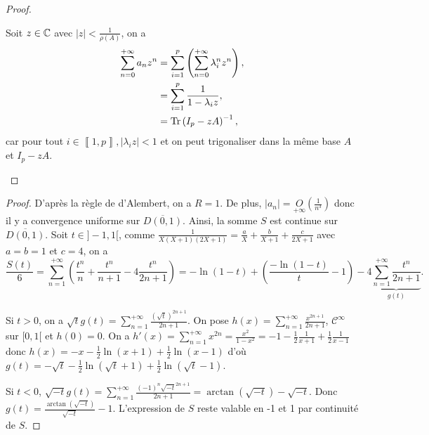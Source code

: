 \documentclass[12pt]{article}
\begin{document}
\begin{proof}
\begin{enumerate}
        Soit $z\in\mathbb{C}$ avec $\left\lvert z\right\rvert<\frac{1}{\rho(A)}$, on a 
        \begin{align}
            \sum_{n=0}^{+\infty}a_{n}z^{n}
            &=\sum_{i=1}^{p}\left(\sum_{n=0}^{+\infty}\lambda_{i}^{n}z^{n}\right),\\
            &=\sum_{i=1}^{p}\frac{1}{1-\lambda_{i}z},\\
            &=\operatorname{Tr}\left(I_{p}-z A\right)^{-1},
        \end{align}
        car pour tout $i\in\left\llbracket1,p\right\rrbracket,\left\lvert \lambda_{i}z\right\rvert<1$ et on peut trigonaliser dans la même base $A$ et $I_{p}-zA$.
    \end{enumerate}
\end{proof}

\begin{proof}
    D'après la règle de d'Alembert, on a $R=1$. De plus, $\left\lvert a_n\right\rvert=\underset{+\infty}{O}\left(\frac{1}{n^{3}}\right)$ donc il y a convergence uniforme sur $\overline{D(0,1)}$. Ainsi, la somme $S$ est continue sur $\overline{D(0,1)}$. Soit $t\in]-1,1[$, comme $\frac{1}{X(X+1)(2X+1)}=\frac{a}{X}+\frac{b}{X+1}+\frac{c}{2X+1}$ avec $a=b=1$ et $c=4$, on a 
    \begin{equation}
        \frac{S(t)}{6}=\sum_{n=1}^{+\infty}\left(\frac{t^{n}}{n}+\frac{t^{n}}{n+1}-4\frac{t^{n}}{2n+1}\right)=-\ln(1-t)+\left(\frac{-\ln(1-t)}{t}-1\right)-4\underbrace{\sum_{n=1}^{+\infty}\frac{t^{n}}{2n+1}}_{g(t)}.
    \end{equation}

    Si $t>0$, on a $\sqrt{t}g(t)=\sum_{n=1}^{+\infty}\frac{(\sqrt{t})^{2n+1}}{2n+1}$. On pose $h(x)=\sum_{n=1}^{+\infty}\frac{x^{2n+1}}{2n+1}$, $\mathcal{C}^{\infty}$ sur $[0,1[$ et $h(0)=0$. On a $h'(x)=\sum_{n=1}^{+\infty}x^{2n}=\frac{x^{2}}{1-x^{2}}=-1-\frac{1}{2}\frac{1}{x+1}+\frac{1}{2}\frac{1}{x-1}$ donc $h(x)=-x-\frac{1}{2}\ln(x+1)+\frac{1}{2}\ln(x-1)$ d'où $g(t)=-\sqrt{t}-\frac{1}{2}\ln(\sqrt{t}+1)+\frac{1}{2}\ln(\sqrt{t}-1)$.

    Si $t<0$, $\sqrt{-t}g(t)=\sum_{n=1}^{+\infty}\frac{(-1)^{n}\sqrt{-t}^{2n+1}}{2n+1}=\arctan(\sqrt{-t})-\sqrt{-t}$. Donc $g(t)=\frac{\arctan(\sqrt{-t})}{\sqrt{-t}}-1$. L'expression de $S$ reste valable en -1 et 1 par continuité de $S$.
\end{proof}
\end{document}
